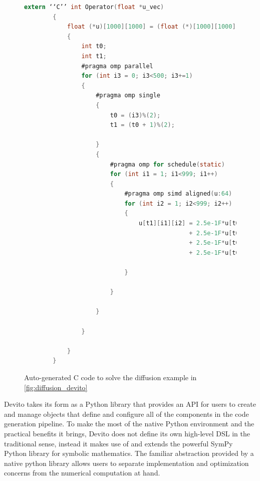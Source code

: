 \documentclass[a4paper,12pt,twoside]{report}
\begin{document}
\begin{figure}[h]
    \begin{lstlisting}[language=C]
        extern ‘‘C’’ int Operator(float *u_vec)
        {
            float (*u)[1000][1000] = (float (*)[1000][1000]) u_vec;
            {
                int t0;
                int t1;
                #pragma omp parallel
                for (int i3 = 0; i3<500; i3+=1)
                {
                    #pragma omp single
                    {
                        t0 = (i3)%(2);
                        t1 = (t0 + 1)%(2);

                    }
                    {
                        #pragma omp for schedule(static)
                        for (int i1 = 1; i1<999; i1++)
                        {
                            #pragma omp simd aligned(u:64)
                            for (int i2 = 1; i2<999; i2++)
                            {
                                u[t1][i1][i2] = 2.5e-1F*u[t0][i1][i2-1]
                                              + 2.5e-1F*u[t0][i1][i2+1]
                                              + 2.5e-1F*u[t0][i1-1][i2]
                                              + 2.5e-1F*u[t0][i1+1][i2];

                            }

                        }

                    }

                }

            }
        }
    \end{lstlisting}
    \caption{Auto-generated C code to solve the diffusion example in \ref{fig:diffusion_devito}}
    \label{fig:diffusion_C}
\end{figure}

Devito takes its form as a Python library that provides an API for users to create and manage objects that define and configure all of the components
in the code generation pipeline. To make the most of the native Python environment and the practical benefits it brings, Devito does not define its 
own high-level DSL in the traditional sense, instead it makes use of and extends the powerful SymPy Python library for symbolic mathematics. 
The familiar abstraction provided by a native python library allows users to separate implementation and optimization concerns from the numerical computation at hand.

\end{document}

